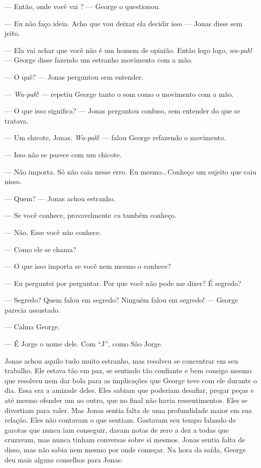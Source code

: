 --- Então, onde você vai ? --- George o questionou.

--- Eu não faço ideia. Acho que vou deixar ela decidir isso --- Jonas disse\mudanca{,} sem jeito.

--- Ela vai achar que você não é um homem de opinião. Então\mudanca{,} logo\mudanca{,} logo, \emph{wa-pah}! --- George disse\mudanca{,} fazendo um estranho movimento com a mão.

--- O quê? --- Jonas perguntou\mudanca{,} sem entender.

--- \emph{Wa-pah}! --- repetiu George tanto o som como o movimento com a mão.

--- O que isso significa? --- Jonas perguntou\mudanca{,} confuso, sem entender do que se tratava.

--- Um chicote, Jonas. \emph{Wa-pah}! --- falou George refazendo o movimento.

--- Isso não se parece com um chicote.

--- Não importa. Só não caia nesse erro. Eu mesmo\ldots\,Conheço um sujeito que caiu nisso.

--- Quem? --- Jonas achou estranho.


--- Se você conhece, provavelmente \emph{eu} também conheço.

--- Não. Esse você não conhece.

--- Como ele se chama?

--- O que isso importa se você nem mesmo o conhece?

--- Eu perguntei por perguntar. Por que você não pode me dizer? É segredo?

--- Segredo? Quem falou em segredo? Ninguém falou em segredo! --- George parecia assustado.

--- Calma George.

--- É Jorge o nome dele. Com ``J'', como São Jorge.

Jonas achou aquilo tudo muito estranho, mas resolveu se concentrar em seu trabalho. Ele estava tão em paz, se sentindo tão confiante e bem consigo mesmo\mudanca{,} que resolveu nem dar bola para as implicações que George teve com ele durante o dia. Essa era a amizade deles. Eles sabiam que poderiam desafiar, pregar peças e até mesmo ofender um ao outro, que no final não havia ressentimentos. Eles se divertiam para valer. Mas Jonas sentia falta de uma profundidade maior em sua relação. Eles não contavam o que sentiam. Gastavam seu tempo falando de garotas que nunca iam conseguir, davam notas de zero a dez a todas que cruzavam, mas nunca tinham conversas sobre si mesmos. Jonas sentia falta de disso, mas não sabia nem mesmo por onde começar. Na hora da saída, George deu mais alguns conselhos para Jonas:

